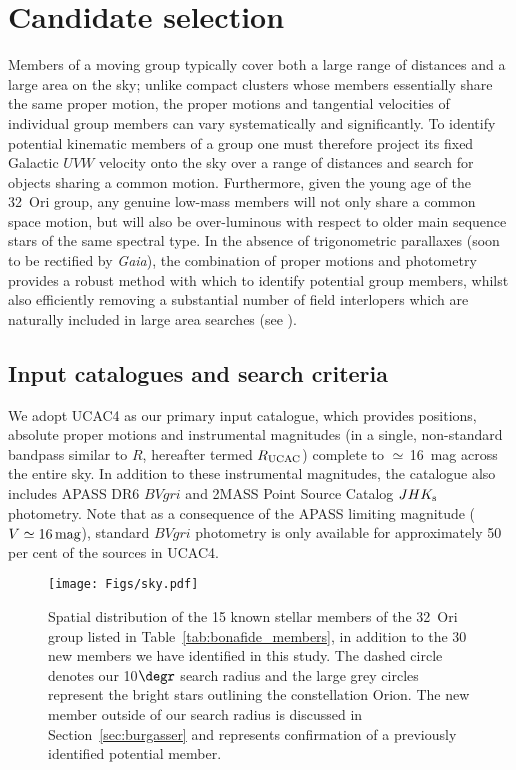 \documentclass[usenatbib]{mnras}
\begin{document}
\section{Candidate selection}
\label{candidate_selection}

Members of a moving group typically cover both a large range of
distances and a large area on the sky; unlike compact clusters
whose members essentially share the same proper motion, the proper
motions and tangential velocities of individual group members can vary
systematically and significantly. To identify potential kinematic
members of a group one must therefore project its fixed Galactic $UVW$
velocity onto the sky over a range of distances and search for objects
sharing a common motion. Furthermore, given the young age of the
32~Ori group, any genuine low-mass members will not only share a
common space motion, but will also be over-luminous with respect to older
 main sequence stars of the same spectral type.  In the absence
of trigonometric parallaxes (soon to be rectified by \emph{Gaia}), the
combination of proper motions and photometry provides a
robust method with which to identify potential group members, whilst
also efficiently removing a substantial number of field interlopers
which are naturally included in large area searches (see \citealp{Kraus14,Murphy15}).

\subsection{Input catalogues and search criteria}
\label{initial_input_catalogue_and_search_criteria}

We adopt UCAC4 as our primary input catalogue, which provides
positions, absolute proper motions and instrumental magnitudes (in a
single, non-standard bandpass similar to $R$, hereafter termed
$R_{\rm{UCAC}}$) complete to $\simeq$\,16~mag across the entire
sky. In addition to these instrumental magnitudes, the catalogue also
includes APASS \citep{Henden12} DR6 $BVgri$ and 2MASS Point Source
Catalog \citep{Cutri03} $JHK_{\rm{s}}$ photometry. Note that as a
consequence of the APASS limiting magnitude ($V \simeq 16\,\rm{mag}$),
standard $BVgri$ photometry is only available for approximately 50 per
cent of the sources in UCAC4.

\begin{figure}
\centering
\texttt{[image: Figs/sky.pdf]}
\caption[]{Spatial distribution of the 15 known stellar members of the 32~Ori
  group listed in Table~\ref{tab:bonafide_members}, in addition to the
  30 new members we have identified in this study. The dashed circle
  denotes our 10$\degr$ search radius and the large grey circles
  represent the bright stars outlining the constellation Orion. The new member
  outside of our search radius is discussed in Section~\ref{sec:burgasser}
  and represents confirmation of a previously identified potential member.}
\label{fig:search_radius}
\end{figure}
\end{document}
